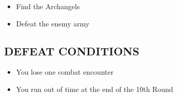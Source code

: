 \begin{multicols*}{2}
\begin{itemize}
  \item Find the Archangels
  \item Defeat the enemy army
\end{itemize}


\subsection*{\MakeUppercase{Defeat Conditions}}
\begin{itemize}
  \item You lose one combat encounter
  \item You run out of time at the end of the 10th Round
\end{itemize}

\end{multicols*}

\newpage

